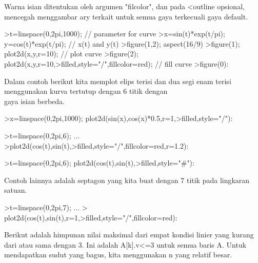 \documentclass{article}
\begin{document}
\begin{eulernotebook}
\begin{eulercomment}
\begin{eulercomment}
\begin{eulercomment}
\begin{eulercomment}
\begin{eulercomment}
\begin{eulercomment}
\begin{eulercomment}
Warna isian ditentukan oleh argumen "filcolor", dan pada \textless{}outline
opsional, mencegah menggambar ary terkait untuk semua gaya terkecuali
gaya default.
\end{eulercomment}
\begin{eulerprompt}
>t=linspace(0,2pi,1000); // parameter for curve
>x=sin(t)*exp(t/pi); y=cos(t)*exp(t/pi); // x(t) and y(t)
>figure(1,2); aspect(16/9)
>figure(1); plot2d(x,y,r=10); // plot curve
>figure(2); plot2d(x,y,r=10,>filled,style="/",fillcolor=red); // fill curve
>figure(0):
\end{eulerprompt}
\begin{eulercomment}
Dalam  contoh  berikut  kita  memplot  elips  terisi  dan  dua  segi
enam  terisi  menggunakan  kurva  tertutup  dengan  6  titik  dengan  \\
gaya  isian  berbeda.
\end{eulercomment}
\begin{eulerprompt}
>x=linspace(0,2pi,1000); plot2d(sin(x),cos(x)*0.5,r=1,>filled,style="/"):
\end{eulerprompt}
\begin{eulerprompt}
>t=linspace(0,2pi,6); ...
>plot2d(cos(t),sin(t),>filled,style="/",fillcolor=red,r=1.2):
\end{eulerprompt}
\begin{eulerprompt}
>t=linspace(0,2pi,6); plot2d(cos(t),sin(t),>filled,style="#"):
\end{eulerprompt}
\begin{eulercomment}
Contoh  lainnya  adalah  septagon  yang  kita  buat  dengan  7  titik
pada  lingkaran  satuan.
\end{eulercomment}
\begin{eulerprompt}
>t=linspace(0,2pi,7);  ...
> plot2d(cos(t),sin(t),r=1,>filled,style="/",fillcolor=red):
\end{eulerprompt}
\begin{eulercomment}
Berikut  adalah  himpunan  nilai  maksimal  dari  empat  kondisi
linier yang  kurang  dari  atau  sama  dengan  3.  Ini  adalah
A[k].v\textless{}=3 untuk semua  baris  A.  Untuk  mendapatkan  sudut  yang
bagus,  kita menggunakan  n  yang  relatif  besar.
\end{eulercomment}

\end{eulercomment}
\end{eulercomment}
\end{eulercomment}
\end{eulercomment}
\end{eulercomment}
\end{eulercomment}
\end{eulernotebook}
\end{document}

